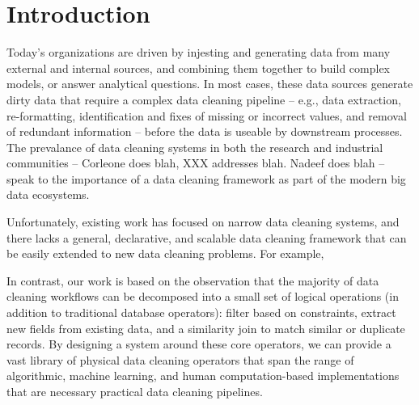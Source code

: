 \section{Introduction}\label{sec:intro}

Today's organizations are driven by injesting and generating data from many external and internal sources,
and combining them together to build complex models, or answer analytical questions.  In most cases, these
data sources generate dirty data that require a complex data cleaning pipeline -- 
e.g., data extraction, re-formatting, identification and fixes of missing or incorrect values,
and removal of redundant information -- before the data is useable by downstream processes.
The prevalance of data cleaning systems in both the research and industrial communities --
Corleone does blah, XXX addresses blah. Nadeef does blah -- speak to the importance of a
data cleaning framework as part of the modern big data ecosystems.  

Unfortunately, existing work has focused on narrow data cleaning systems, and 
there lacks a general, declarative, and scalable data cleaning framework that can be easily extended to new
data cleaning problems.  For example, 

In contrast, our work is based on the observation that the majority of data cleaning workflows
can be decomposed into a small set of logical operations (in addition to traditional database operators):
filter based on constraints, extract new fields from existing data, and a similarity join to match
similar or duplicate records.    
By designing a system around these core operators, we can provide a vast library of physical  
data cleaning operators that span the range of algorithmic, machine learning, and human computation-based
implementations that are necessary practical data cleaning pipelines.   

